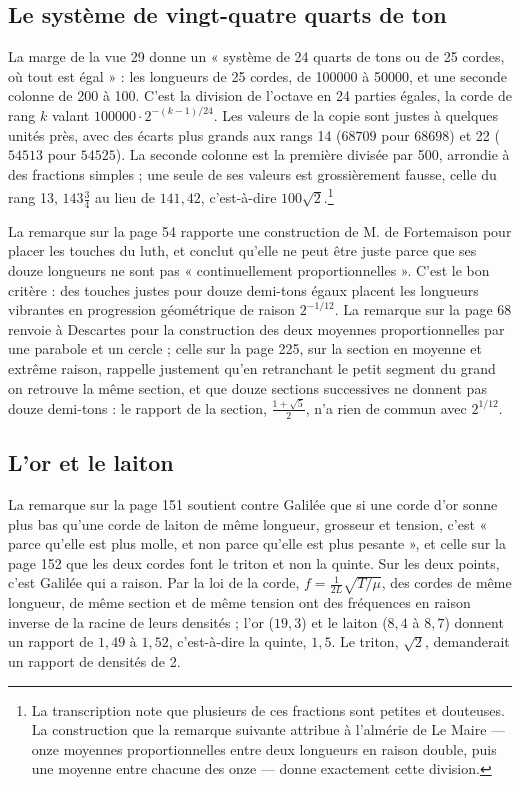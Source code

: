 \documentclass[11pt,a4paper]{article}
\begin{document}
\subsection*{Le système de vingt-quatre quarts de ton}

La marge de la vue 29 donne un « système de 24 quarts de tons ou de 25 cordes, où
tout est égal » : les longueurs de 25 cordes, de 100000 à 50000, et une seconde
colonne de 200 à 100. C'est la division de l'octave en 24 parties égales, la
corde de rang $k$ valant $100000 \cdot 2^{-(k-1)/24}$. Les valeurs de la copie
sont justes à quelques unités près, avec des écarts plus grands aux rangs 14
($68709$ pour $68698$) et 22 ($54513$ pour $54525$). La seconde colonne est la
première divisée par 500, arrondie à des fractions simples ; une seule de ses
valeurs est grossièrement fausse, celle du rang 13, $143\frac34$ au lieu de
$141{,}42$, c'est-à-dire $100\sqrt2$.\footnote{La transcription note que
plusieurs de ces fractions sont petites et douteuses. La construction que la
remarque suivante attribue à l'almérie de Le Maire — onze moyennes
proportionnelles entre deux longueurs en raison double, puis une moyenne entre
chacune des onze — donne exactement cette division.}

La remarque sur la page 54 rapporte une construction de M. de Fortemaison pour
placer les touches du luth, et conclut qu'elle ne peut être juste parce que ses
douze longueurs ne sont pas « continuellement proportionnelles ». C'est le bon
critère : des touches justes pour douze demi-tons égaux placent les longueurs
vibrantes en progression géométrique de raison $2^{-1/12}$. La remarque sur la
page 68 renvoie à Descartes pour la construction des deux moyennes
proportionnelles par une parabole et un cercle ; celle sur la page 225, sur la
section en moyenne et extrême raison, rappelle justement qu'en retranchant le
petit segment du grand on retrouve la même section, et que douze sections
successives ne donnent pas douze demi-tons : le rapport de la section,
$\frac{1+\sqrt5}{2}$, n'a rien de commun avec $2^{1/12}$.

\subsection*{L'or et le laiton}

La remarque sur la page 151 soutient contre Galilée que si une corde d'or sonne
plus bas qu'une corde de laiton de même longueur, grosseur et tension, c'est
« parce qu'elle est plus molle, et non parce qu'elle est plus pesante », et celle
sur la page 152 que les deux cordes font le triton et non la quinte. Sur les deux
points, c'est Galilée qui a raison. Par la loi de la corde,
$f = \frac{1}{2L}\sqrt{T/\mu}$, des cordes de même longueur, de même section et
de même tension ont des fréquences en raison inverse de la racine de leurs
densités ; l'or ($19{,}3$) et le laiton ($8{,}4$ à $8{,}7$) donnent un rapport de
$1{,}49$ à $1{,}52$, c'est-à-dire la quinte, $1{,}5$. Le triton, $\sqrt2$,
demanderait un rapport de densités de 2.
\end{document}
